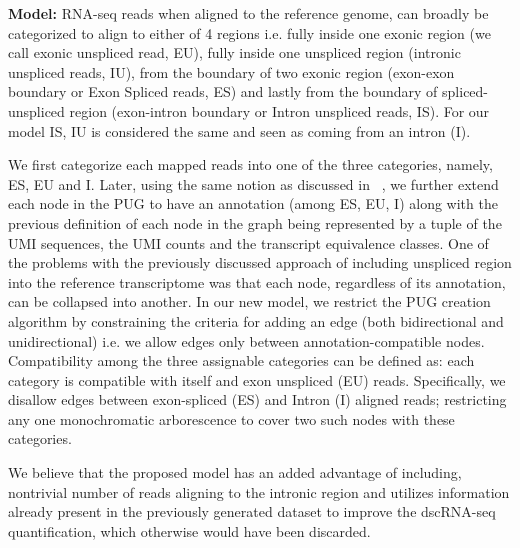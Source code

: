 \textbf{Model:} RNA-seq reads when aligned to the reference genome, can broadly be categorized to 
align to either of 4 regions i.e. fully inside one exonic region (we call exonic unspliced read, EU), 
fully inside one unspliced region (intronic unspliced reads, IU),  from the boundary of two
exonic region (exon-exon boundary or Exon Spliced reads, ES) and lastly from the boundary of 
spliced-unspliced region (exon-intron boundary or Intron unspliced reads, IS). For our
model IS, IU is considered the same and seen as coming from an intron (I).

We first categorize each mapped reads into one of the three categories, namely, ES, EU and I.
Later, using the same notion as discussed in ~, we further extend each node in the PUG 
to have an annotation (among ES, EU, I) along with the previous definition of each node in the graph
being represented by a tuple of the UMI sequences, the UMI counts and the transcript 
equivalence classes. One of the problems with the previously discussed \naive approach of including 
unspliced region into the reference transcriptome was that each node, regardless of its annotation, 
can be collapsed into another. In our new model, we restrict the PUG creation algorithm by constraining 
the criteria for adding an edge (both bidirectional and unidirectional) i.e. we allow edges only between
annotation-compatible nodes. Compatibility among the three assignable categories can be defined as:
each category is compatible with itself and exon unspliced (EU) reads. Specifically, we disallow
edges between exon-spliced (ES) and Intron (I) aligned reads; restricting any one monochromatic
arborescence to cover two such nodes with these categories.

We believe that the proposed model has an added advantage of including, nontrivial number of reads
aligning to the intronic region and utilizes information already present in the previously generated
dataset to improve the dscRNA-seq quantification, which otherwise would have been discarded.
